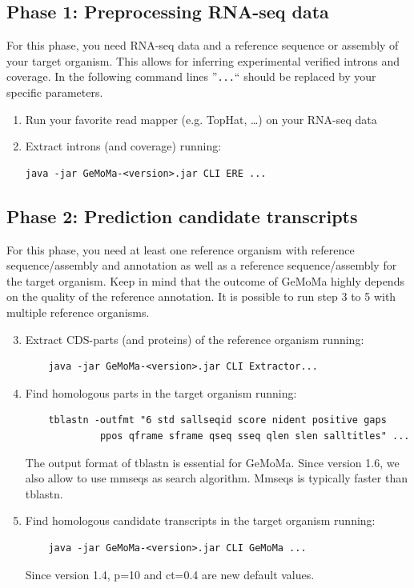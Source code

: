 \documentclass{article}
\begin{document}
\clearpage

\subsection{Phase 1: Preprocessing RNA-seq data}
For this phase, you need RNA-seq data and a reference sequence or assembly of your target organism.
This allows for inferring experimental verified introns and coverage. In the following command lines ''\verb"..."`` should be replaced by your specific parameters.

\begin{enumerate}
\item	Run your favorite read mapper (e.g. TopHat, \ldots) on your RNA-seq data
\item	Extract introns (and coverage) running: 
\begin{verbatim}
java -jar GeMoMa-<version>.jar CLI ERE ...
\end{verbatim}
\end{enumerate}

\subsection{Phase 2: Prediction candidate transcripts}
For this phase, you need at least one reference organism with reference sequence/assembly and annotation as well as a reference sequence/assembly for the target organism.
Keep in mind that the outcome of GeMoMa highly depends on the quality of the reference annotation.
It is possible to run step 3 to 5 with multiple reference organisms.

\begin{enumerate}
\setcounter{enumi}{2}
\item Extract CDS-parts (and proteins) of the reference organism running:
	\begin{verbatim}
	java -jar GeMoMa-<version>.jar CLI Extractor...
	\end{verbatim}
\item Find homologous parts in the target organism running: 
	\begin{verbatim}
	tblastn -outfmt "6 std sallseqid score nident positive gaps
	         ppos qframe sframe qseq sseq qlen slen salltitles" ...
	\end{verbatim}
	The output format of tblastn is essential for GeMoMa. Since version 1.6, we also allow to use mmseqs as search algorithm. Mmseqs is typically faster than tblastn.
\item Find homologous candidate transcripts in the target organism running:
	\begin{verbatim}
	java -jar GeMoMa-<version>.jar CLI GeMoMa ...
	\end{verbatim}
	Since version 1.4, p=10 and ct=0.4 are new default values.
\end{enumerate}
\end{document}
